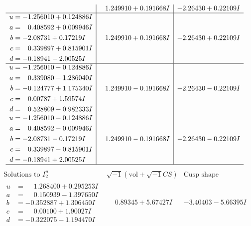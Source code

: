 \documentclass[1p]{elsarticle_modified}
\theoremstyle{definition}
\newcommand{\I}{\sqrt{-1}}
\begin{document}
$$\begin{array}{c|c|c}
 & \phantom{-}1.249910 + 0.191668 I & -2.26430 + 0.22109 I \\ \hline\begin{aligned}
u &= -1.256010 + 0.124886 I \\
a &= \phantom{-}0.408592 + 0.009946 I \\
b &= -2.08731 + 0.17219 I \\
c &= \phantom{-}0.339897 + 0.815901 I \\
d &= -0.18941 - 2.00525 I\end{aligned}
 & \phantom{-}1.249910 + 0.191668 I & -2.26430 + 0.22109 I \\ \hline\begin{aligned}
u &= -1.256010 - 0.124886 I \\
a &= \phantom{-}0.339080 - 1.286040 I \\
b &= -0.124777 + 1.175340 I \\
c &= \phantom{-}0.00787 + 1.59574 I \\
d &= \phantom{-}0.528809 - 0.982333 I\end{aligned}
 & \phantom{-}1.249910 - 0.191668 I & -2.26430 - 0.22109 I \\ \hline\begin{aligned}
u &= -1.256010 - 0.124886 I \\
a &= \phantom{-}0.408592 - 0.009946 I \\
b &= -2.08731 - 0.17219 I \\
c &= \phantom{-}0.339897 - 0.815901 I \\
d &= -0.18941 + 2.00525 I\end{aligned}
 & \phantom{-}1.249910 - 0.191668 I & -2.26430 - 0.22109 I\\
 \hline 
 \end{array}$$\newpage$$\begin{array}{c|c|c}  
\text{Solutions to }I^u_{2}& \I (\text{vol} + \sqrt{-1}CS) & \text{Cusp shape}\\
 \hline 
\begin{aligned}
u &= \phantom{-}1.268400 + 0.295253 I \\
a &= \phantom{-}0.150939 - 1.397650 I \\
b &= -0.352887 + 1.306450 I \\
c &= \phantom{-}0.00100 + 1.90027 I \\
d &= -0.322075 - 1.194470 I\end{aligned}
 & \phantom{-}0.89345 + 5.67427 I & -3.40403 - 5.66395 I \\ \hline\begin{aligned}

\end{aligned}
\end{array}$$
\end{document}
